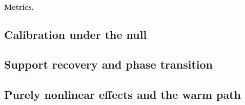 \paragraph{Metrics.}

\subsection{Calibration under the null}\label{sec:exp-null}

\subsection{Support recovery and phase transition}\label{sec:exp-transition}

\subsection{Purely nonlinear effects and the warm path}\label{sec:exp-path}

